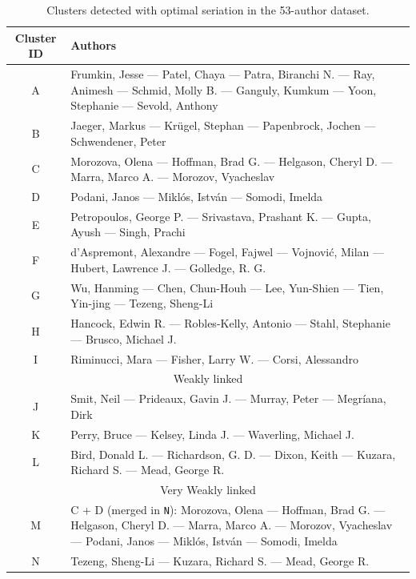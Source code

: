 \documentclass[a4paper,11pt, reqno]{amsart}
\begin{document}
{\begin{table}[ht]
\centering
\renewcommand{\arraystretch}{1.2}
\begin{tabular}{|c|p{12.5cm}|}
\hline
\textbf{Cluster ID} & \textbf{Authors} \\
\hline
A & Frumkin, Jesse — Patel, Chaya — Patra, Biranchi N. — Ray, Animesh — Schmid, Molly B. — Ganguly, Kumkum — Yoon, Stephanie — Sevold, Anthony \\
\hline
B & Jaeger, Markus — Krügel, Stephan — Papenbrock, Jochen — Schwendener, Peter \\
\hline
C & Morozova, Olena — Hoffman, Brad G. — Helgason, Cheryl D. — Marra, Marco A. — Morozov, Vyacheslav \\
\hline
D & Podani, Janos — Miklós, István — Somodi, Imelda \\
\hline
E & Petropoulos, George P. — Srivastava, Prashant K. — Gupta, Ayush — Singh, Prachi \\
\hline
F & d’Aspremont, Alexandre — Fogel, Fajwel — Vojnović, Milan — Hubert, Lawrence J. — Golledge, R. G. \\
\hline
G & Wu, Hanming — Chen, Chun-Houh — Lee, Yun-Shien — Tien, Yin-jing — Tezeng, Sheng-Li \\
\hline
H & Hancock, Edwin R. — Robles-Kelly, Antonio — Stahl, Stephanie — Brusco, Michael J. \\
\hline
I & Riminucci, Mara — Fisher, Larry W. — Corsi, Alessandro \\
\hline
\multicolumn{2}{c}{Weakly linked} \\
\hline
\rowcolor{gray!15}J & Smit, Neil — Prideaux, Gavin J. — Murray, Peter — Megríana, Dirk \\
\hline
\rowcolor{gray!15}K & Perry, Bruce — Kelsey, Linda J. — Waverling, Michael J. \\
\hline
\rowcolor{gray!15}L & Bird, Donald L. — Richardson, G. D. — Dixon, Keith — Kuzara, Richard S. — Mead, George R. \\
\hline
\multicolumn{2}{c}{Very Weakly linked} \\
\hline
\rowcolor{gray!20}M & C + D (merged in \texttt{N}): Morozova, Olena — Hoffman, Brad G. — Helgason, Cheryl D. — Marra, Marco A. — Morozov, Vyacheslav — Podani, Janos — Miklós, István — Somodi, Imelda \\
\hline
\rowcolor{gray!20}N & Tezeng, Sheng-Li — Kuzara, Richard S. — Mead, George R. \\
\hline
\end{tabular}
\caption{Clusters detected with optimal seriation in the 53-author dataset.}
\label{table:clusters53_updated}
\end{table}

}
\end{document}
